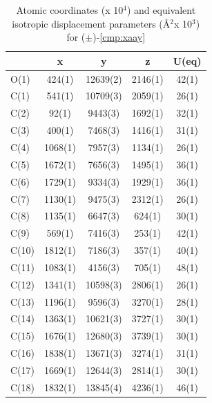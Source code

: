 \twocolumn
\begin{table}[h]
\centering
\caption{Atomic coordinates (x 10$^4$) and equivalent isotropic displacement parameters (\AA$^2$x
10$^3$) for ($\pm$)-\ref{cmp:xaay}}
{\footnotesize
\begin{tabular}{lcccc} 
\\
\toprule
& x & y & z & U(eq) \\
\midrule
O(1)&	424(1)&	12639(2)&	2146(1)&	42(1) \\
C(1)&	541(1)&	10709(3)&	2059(1)&	26(1) \\ 
C(2)&	92(1)&	9443(3)&	1692(1)&	32(1) \\
C(3)&	400(1)&	7468(3)&	1416(1)&	31(1) \\
C(4)&	1068(1)&	7957(3)&	1134(1)&	26(1) \\
C(5)&	1672(1)&	7656(3)&	1495(1)&	36(1) \\
C(6)&	1729(1)&	9334(3)&	1929(1)&	36(1) \\
C(7)&	1130(1)&	9475(3)&	2312(1)&	26(1) \\
C(8)&	1135(1)&	6647(3)&	624(1)&	30(1) \\
C(9)&	569(1)&	7416(3)&	253(1)&	42(1) \\
C(10)&	1812(1)&	7186(3)&	357(1)&	40(1) \\
C(11)&	1083(1)&	4156(3)&	705(1)&	48(1) \\
C(12)&	1341(1)&	10598(3)&	2806(1)&	26(1) \\
C(13)&	1196(1)&	9596(3)&	3270(1)&	28(1) \\
C(14)&	1363(1)&	10621(3)&	3727(1)&	30(1) \\
C(15)&	1676(1)&	12680(3)&	3739(1)&	30(1) \\
C(16)&	1838(1)&	13671(3)&	3274(1)&	31(1) \\
C(17)&	1669(1)&	12644(3)&	2814(1)&	30(1) \\
C(18)&	1832(1)&	13845(4)&	4236(1)&	46(1)\\
\bottomrule
\end{tabular}
}
\end{table} 


